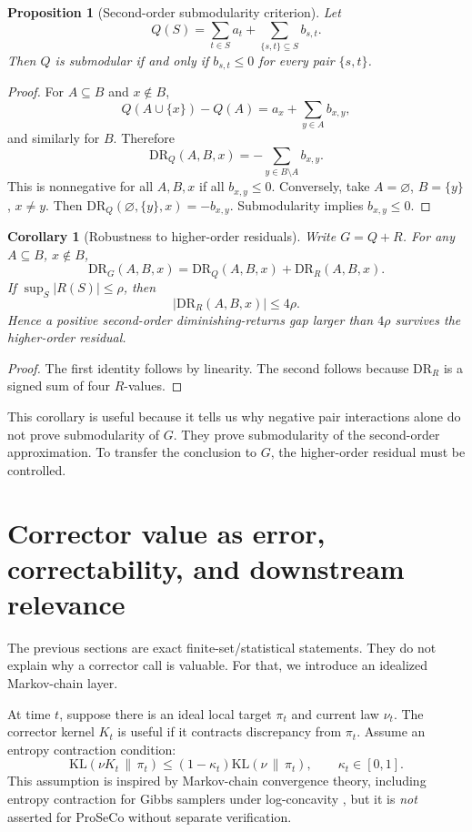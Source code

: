 \documentclass[11pt]{article}
\newtheorem{proposition}{Proposition}
\newtheorem{corollary}{Corollary}
\newcommand{\1}{\mathbf 1}
\newcommand{\KL}{\mathrm{KL}}
\begin{document}
\begin{proposition}[Second-order submodularity criterion]
Let
\[
  Q(S)=\sum_{t\in S}a_t+\sum_{\{s,t\}\subseteq S}b_{s,t}.
\]
Then \(Q\) is submodular if and only if \(b_{s,t}\le 0\) for every pair
\(\{s,t\}\).
\end{proposition}

\begin{proof}
For \(A\subseteq B\) and \(x\notin B\),
\[
Q(A\cup\{x\})-Q(A)
=
a_x+\sum_{y\in A}b_{x,y},
\]
and similarly for \(B\).  Therefore
\[
\mathrm{DR}_Q(A,B,x)
=
-\sum_{y\in B\setminus A}b_{x,y}.
\]
This is nonnegative for all \(A,B,x\) if all \(b_{x,y}\le0\).  Conversely,
take \(A=\varnothing\), \(B=\{y\}\), \(x\ne y\).  Then
\(\mathrm{DR}_Q(\varnothing,\{y\},x)=-b_{x,y}\).  Submodularity implies
\(b_{x,y}\le0\).
\end{proof}

\begin{corollary}[Robustness to higher-order residuals]
Write \(G=Q+R\).  For any \(A\subseteq B\), \(x\notin B\),
\[
  \mathrm{DR}_G(A,B,x)
  =
  \mathrm{DR}_Q(A,B,x)
  +
  \mathrm{DR}_R(A,B,x).
\]
If \(\sup_S |R(S)|\le \rho\), then
\[
  |\mathrm{DR}_R(A,B,x)|\le 4\rho.
\]
Hence a positive second-order diminishing-returns gap larger than \(4\rho\)
survives the higher-order residual.
\end{corollary}

\begin{proof}
The first identity follows by linearity.  The second follows because
\(\mathrm{DR}_R\) is a signed sum of four \(R\)-values.
\end{proof}

This corollary is useful because it tells us why negative pair interactions
alone do not prove submodularity of \(G\).  They prove submodularity of the
second-order approximation.  To transfer the conclusion to \(G\), the
higher-order residual must be controlled.

\section{Corrector value as error, correctability, and downstream relevance}

The previous sections are exact finite-set/statistical statements.  They do
not explain why a corrector call is valuable.  For that, we introduce an
idealized Markov-chain layer.

At time \(t\), suppose there is an ideal local target \(\pi_t\) and current law
\(\nu_t\).  The corrector kernel \(K_t\) is useful if it contracts discrepancy
from \(\pi_t\).  Assume an entropy contraction condition:
\[
  \KL(\nu K_t\,\|\,\pi_t)
  \le
  (1-\kappa_t)\KL(\nu\,\|\,\pi_t),
  \qquad
  \kappa_t\in[0,1].
\]
This assumption is inspired by Markov-chain convergence theory, including
entropy contraction for Gibbs samplers under log-concavity
\cite{ascolani2024entropy}, but it is \emph{not} asserted for ProSeCo without
separate verification.
\end{document}
